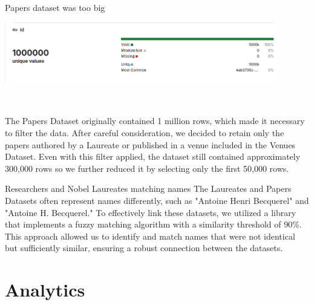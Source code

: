 \documentclass[aspectratio=169,xcolor=dvipsnames]{beamer}
\begin{document}
\begin{frame}{Papers dataset was too big}
	\centering
	\begin{minipage}{0.8\textwidth}
		\centering
		\includegraphics[width=0.9\textwidth]{huge_dataset.png}
	\end{minipage} \\
	\vspace{1em}
	\begin{minipage}{0.8\textwidth}
		The Papers Dataset originally contained 1 million rows, which made it necessary to filter the data.
		After careful consideration, we decided to retain only the papers authored by a Laureate or published
		in a venue included in the Venues Dataset.
		Even with this filter applied, the dataset still contained approximately 300,000 rows so we further
		reduced it by selecting only the first 50,000 rows.
	\end{minipage}
\end{frame}

\begin{frame}{Researchers and Nobel Laureates matching names}
	The Laureates and Papers Datasets often represent names differently, such as "Antoine Henri Becquerel"
	and "Antoine H. Becquerel." To effectively link these datasets, we utilized a library that implements a
	fuzzy matching algorithm with a similarity threshold of 90\%. This approach allowed us to identify and
	match names that were not identical but sufficiently similar, ensuring a robust connection between the
	datasets.
\end{frame}

\section{Analytics}
\end{document}
